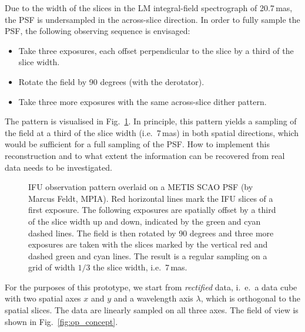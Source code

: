 Due to the width of the slices in the LM integral-field spectrograph
of 20.7\,mas, the PSF is undersampled in the across-slice direction.
In order to fully sample the PSF, the following observing sequence is envisaged:
\begin{itemize}
    \item Take three exposures, each offset perpendicular to the slice by a third of the slice width.
    \item Rotate the field by 90 degrees (with the derotator).
    \item Take three more exposures with the same across-slice dither pattern.
\end{itemize}

The pattern is visualised in Fig.~\ref{fig:ifu_pattern}. In principle,
this pattern yields a sampling of the field at a third of the slice
width (i.e.~7\,mas) in both spatial directions, which would be
sufficient for a full sampling of the PSF. How to implement this
reconstruction and to what extent the information can be recovered
from real data needs to be investigated.

\begin{figure}[hb]
  \centering
  \caption[IFU dithering and rotation pattern]{%
    IFU observation pattern overlaid on a METIS SCAO PSF (by Marcus
    Feldt, MPIA). Red horizontal lines mark the IFU slices of a first
    exposure. The following exposures are spatially offset by a third
    of the slice width up and down, indicated by the green and cyan
    dashed lines. The field is then rotated by 90 degrees and three
    more exposures are taken with the slices marked by the vertical
    red and dashed green and cyan lines. The result is a regular
    sampling on a grid of width $1/3$ the slice width, i.e.~7\,mas.}
  \label{fig:ifu_pattern}
\end{figure}

For the purposes of this prototype, we start from \emph{rectified} data,
i.~e.~a data cube with two spatial axes $x$ and $y$ and a wavelength axis $\lambda$,
which is orthogonal to the spatial slices. The data are linearly sampled on all three axes.
The field of view is shown in Fig.~\ref{fig:op_concept}.


